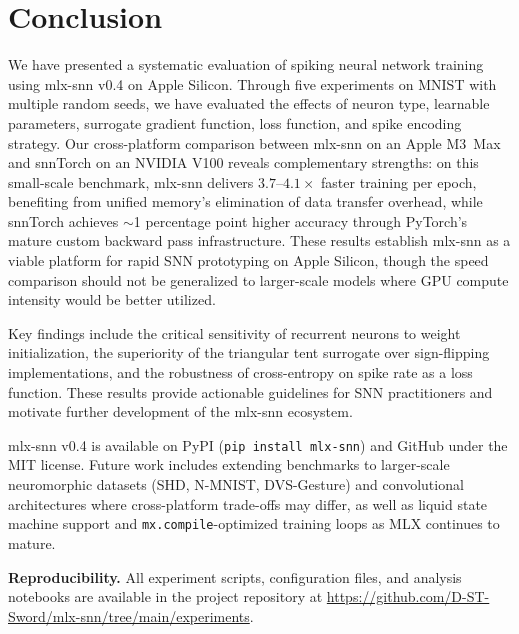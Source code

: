 \documentclass[11pt]{article}
\begin{document}
\section{Conclusion}

We have presented a systematic evaluation of spiking neural network training using mlx-snn v0.4 on Apple Silicon. Through five experiments on MNIST with multiple random seeds, we have evaluated the effects of neuron type, learnable parameters, surrogate gradient function, loss function, and spike encoding strategy. Our cross-platform comparison between mlx-snn on an Apple M3~Max and snnTorch on an NVIDIA V100 reveals complementary strengths: on this small-scale benchmark, mlx-snn delivers $3.7$--$4.1\times$ faster training per epoch, benefiting from unified memory's elimination of data transfer overhead, while snnTorch achieves $\sim$1 percentage point higher accuracy through PyTorch's mature custom backward pass infrastructure. These results establish mlx-snn as a viable platform for rapid SNN prototyping on Apple Silicon, though the speed comparison should not be generalized to larger-scale models where GPU compute intensity would be better utilized.

Key findings include the critical sensitivity of recurrent neurons to weight initialization, the superiority of the triangular tent surrogate over sign-flipping implementations, and the robustness of cross-entropy on spike rate as a loss function. These results provide actionable guidelines for SNN practitioners and motivate further development of the mlx-snn ecosystem.

mlx-snn v0.4 is available on PyPI (\texttt{pip install mlx-snn}) and GitHub under the MIT license. Future work includes extending benchmarks to larger-scale neuromorphic datasets (SHD, N-MNIST, DVS-Gesture) and convolutional architectures where cross-platform trade-offs may differ, as well as liquid state machine support and \texttt{mx.compile}-optimized training loops as MLX continues to mature.

\bigskip
\noindent\textbf{Reproducibility.} All experiment scripts, configuration files, and analysis notebooks are available in the project repository at \url{https://github.com/D-ST-Sword/mlx-snn/tree/main/experiments}.



\end{document}
